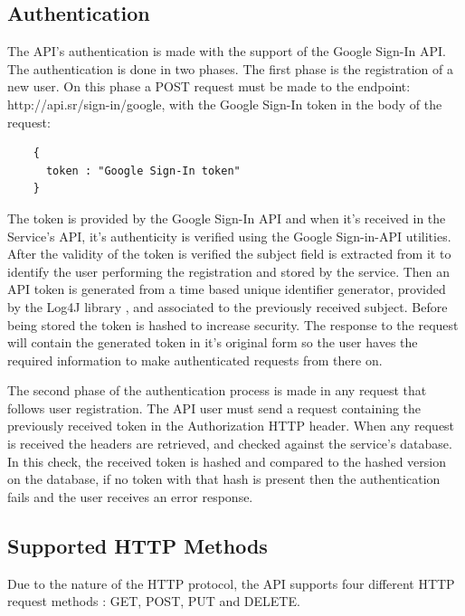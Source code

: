         \newpage
    
    \subsection*{Authentication}
    The API's authentication is made with the support of the Google Sign-In API. 
    The authentication is done in two phases. The first phase is the registration of a new user. 
    On this phase a POST \cite{httppostdocs} request must be made to the endpoint: http://api.sr/sign-in/google, 
    with the Google Sign-In token in the body of the request:
    \begin{lstlisting}
    {
      token : "Google Sign-In token"
    }
     \end{lstlisting}
    The token is provided by the Google Sign-In API and when it's received in the Service's API, 
    it's authenticity is verified using the Google Sign-in-API utilities. After the validity of the token is verified 
    the subject field is extracted from it to identify the user performing the registration and stored by the service. 
    Then an API token is generated from a time based unique identifier generator, provided by the Log4J library \cite{log4j},
    and associated to the previously received subject. Before being stored the token is hashed to increase security. 
    The response to the request will contain the generated token in it's original form so the user haves the required information 
    to make authenticated requests from there on.\par

    The second phase of the authentication process is made in any request that follows user registration. The API user must 
    send a request containing the previously received token in the Authorization HTTP header. When any request is received 
    the headers are retrieved, and checked against the service's database. In this check, the received token is hashed and 
    compared to the hashed version on the database, if no token with that hash is present then the authentication fails 
    and the user receives an error response.

    \newpage
    \subsection*{Supported HTTP Methods}
        Due to the nature of the HTTP protocol, the API supports four different HTTP request methods \cite{apihttpverbsdocs}: GET, POST, PUT and DELETE.
        
